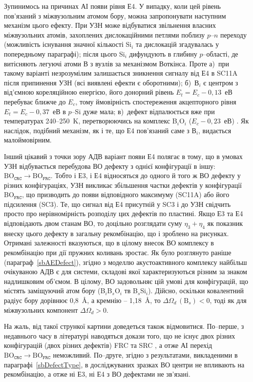 Зупинимось на причинах АІ появи рівня Е4.
У випадку, коли цей рівень пов'язаний з міжвузольним атомом бору, можна запропонувати наступним механізм цього ефекту.
При УЗН може відбуватися звільнення власних міжвузольних атомів, захоплених дислокаційними петлями поблизу $p$--$n$ переходу (можливість існування значної кількості Si$_i$ та дислокацій згадувалась у попередньому параграфі);
після цього Si$_i$ дифундують в глибину $p$--області, де витісняють легуючі атоми В з вузлів за механізмом Воткінса.
Проте
а)~при такому варіанті незрозумілим залишається зникнення сигналу від Е4 в SC11A після припинення УЗН (всі виявлені ефекти є оборотними);
б)~В$_i$ є центром з від'ємною кореляційною енергією, його донорний рівень $E_t=E_c-0,13$~еВ \cite{Bi:Harris} перебуває ближче до $E_c$, тому ймовірність спостереження акцепторного рівня
$E_t=E_c-0,37$~еВ в $p$--Si дуже мала;
в)~дефект відпалюється вже при температурах 240--250~K, перетворюючись на комплекс B$_i$O$_i$ ($E_c-0,23$~еВ) \cite{PhysRevB94}.
Як наслідок, подібний механізм, як і те, що Е4 пов'язаний саме з В$_i$, видається малоймовірним.

Інший цікавий з точки зору АДВ варіант появи Е4 полягає в тому, що в умовах УЗН відбувається
перебудова ВО дефекту з однієї конфігурації в іншу: $\mbox{BO}_\mathtt{CRC} \rightarrow \mbox{BO}_\mathtt{FRC}$.
Тобто і Е3, і Е4 відносяться до одного й того ж ВО дефекту у різних конфігураціях,
УЗН викликає збільшення частки дефектів у конфігурації  BO$_\mathtt{FRC}$, що призводить до появи відповідного максимуму (SC11A) або його підсилення (SC3).
Те, що сигнал від Е4 присутній у SC3 і до УЗН свідчить просто про нерівномірність розподілу цих дефектів по пластині.
Якщо Е3 та Е4 відповідають двом станам ВО, то доцільно розглядати суму $\eta_3+\eta_4$ як показник внеску цього дефекту в загальну рекомбінацію, що і зроблено на рисунках.
Отримані залежності вказуються, що в цілому внесок ВО комплексу в рекомбінацію при дії пружних коливань зростає.
Як було розглянуто раніше (параграф~\ref{sbAEDefect}), згідно з моделлю акустоактивного комплексу найбільш очікуваною АДВ є для системи, складові якої характеризуються різним за знаком надлишковим об'ємом.
В цілому, ВО задовольняє цій умові для конфігурацій, що містять заміщуючий атом бору (B$_i$B$_s$O$_i$ тв B$_s$Si$_i$).
Дійсно, оскільки ковалентний радіус бору дорівнює 0,8~{\AA}, а кремнію -- 1,18~{\AA},
то $\Delta\Omega_d\,(\mbox{B}_s)<0$,
тоді як для міжвузольних компонент $\Delta\Omega_d>0$.

На жаль, від такої стрункої картини доведеться також відмовитися.
По--перше, з недавнього часу в літературі наводяться докази того, що не існує двох
різних конфігурацій  (двох різних дефектів) FRC та SRC \cite{BOSingle:Voronkov,BO3i,BOSingle:SEMSS2017,Kim},
а отже АІ перехід $\mbox{BO}_\mathtt{CRC} \rightarrow \mbox{BO}_\mathtt{FRC}$ неможливий.
По--друге, згідно з результатами, викладеними в параграфі~\ref{sbDefectType},
в досліджуваних зразках ВО центри не впливають на рекомбінацію,
а отже ні Е3, ні Е4 з ВО дефектами не зв'язані.



